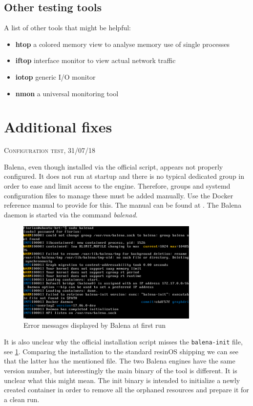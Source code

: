 \documentclass[]{scrartcl}
\begin{document}
\subsection{Other testing tools}

A list of other tools that might be helpful:

\begin{itemize}
	\item \textbf{htop} a colored memory view to analyse memory use of single processes
	\item \textbf{iftop} interface monitor to view actual network traffic
	\item \textbf{iotop} generic I/O monitor
	\item \textbf{nmon} a universal monitoring tool
\end{itemize}

\section{Additional fixes}
{\small\textsc{Configuration test, 31/07/18} \bigskip}

Balena, even though installed via the official script, appears not properly configured. It does not run at startup and there is no typical dedicated group in order to ease and limit access to the engine.
Therefore, groups and systemd configuration files to manage these must be added manually. Use the Docker reference manual to provide for this. The manual can be found at \cite{docker02}. The Balena daemon is started via the command \textit{balenad}.

\begin{figure}[t]
	\centering
	\includegraphics[width=0.8\textwidth]{balena-err}
	\caption{Error messages displayed by Balena at first run}
	\label{fig:balenad}
\end{figure}

It is also unclear why the official installation script misses the \texttt{balena-init} file, see \ref{fig:balenad}. 
Comparing the installation to the standard resinOS shipping we can see that the latter has the mentioned file.  The two Balena engines have the same version number, but interestingly the main binary of the tool is different. 
It is unclear what this might mean. The init binary is intended to initialize a newly created container in order to remove all the orphaned resources and prepare it for a clean run. 
\end{document}
